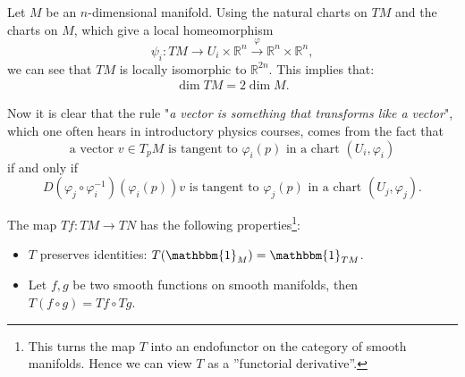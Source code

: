     \begin{property}[Dimension]
        Let $M$ be an $n$-dimensional manifold. Using the natural charts on $TM$ and the charts on $M$, which give a local homeomorphism \[\psi_i:TM\rightarrow U_i\times\mathbb{R}^n\xrightarrow{\varphi}\mathbb{R}^n\times\mathbb{R}^n,\] we can see that $TM$ is locally isomorphic to $\mathbb{R}^{2n}$. This implies that:
        \begin{gather}
            \dim TM = 2\dim M.
        \end{gather}
    \end{property}

    \begin{remark}
        Now it is clear that the rule "\textit{a vector is something that transforms like a vector}", which one often hears in introductory physics courses, comes from the fact that \[\text{a vector }v\in T_pM\text{ is tangent to }\varphi_i(p)\text{ in a chart }(U_i, \varphi_i)\] if and only if \[D(\varphi_j\circ\varphi_i^{-1})(\varphi_i(p))v\text{ is tangent to }\varphi_j(p)\text{ in a chart }(U_j, \varphi_j).\]
    \end{remark}


    \begin{property}
        The map $Tf:TM\rightarrow TN$ has the following properties\footnote{This turns the map $T$ into an endofunctor on the category of smooth manifolds. Hence we can view $T$ as a ''functorial derivative''.}:
        \begin{itemize}
            \item $T$ preserves identities: $T(\mathbbm{1}_M) = \mathbbm{1}_{TM}$.
            \item Let $f, g$ be two smooth functions on smooth manifolds, then $T(f\circ g) = Tf\circ Tg$.
        \end{itemize}
    \end{property}



